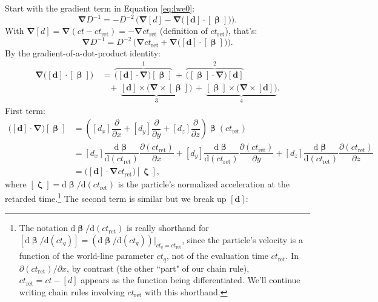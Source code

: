 \documentclass[12pt]{article}
\renewcommand{\vv}[1]{\mathbf{#1}}
\newcommand{\dd}[1]{\mathrm{d}#1}
\newcommand{\vvbeta}{\bm{\upbeta}}
\newcommand{\vvzeta}{\bm{\upzeta}}
\newcommand{\del}{\boldsymbol{\nabla}}
\begin{document}
Start with the gradient term in Equation \ref{eq:lwe0}:
\begin{equation*}
\del D^{-1} = - D^{-2} \, \Big( \del [d] - \del \big( [\vv d] \cdot [\vvbeta] \big) \Big).
\end{equation*}
With $\del [d] = \del ( ct - ct_{\mathrm{ret}} ) = - \del ct_{\mathrm{ret}}$ (definition of $ct_{\mathrm{ret}}$), that's:
\begin{equation}\label{eq:gradterm1}
\del D^{-1} = D^{-2} \, \Big( \del ct_{\mathrm{ret}} + \del \big( [\vv d] \cdot [\vvbeta] \big) \Big) .
\end{equation}
By the gradient-of-a-dot-product identity:
\begin{equation*}
\begin{aligned}
\del \big( [\vv d] \cdot [\vvbeta] \big) \, &= \, \overbrace{\big( [\vv d] \cdot \del \big) [\vvbeta]}^\text{1} \, + \, \overbrace{\big( [\vvbeta] \cdot \del \big) [\vv d]}^\text{2} \\[6pt]
& \; \; \; + \, \underbrace{[\vv d] \times \big( \del \times [\vvbeta] \big)}_\text{3} \, + \, \underbrace{[\vvbeta] \times \big( \del \times [\vv d] \big)}_\text{4} .
\end{aligned}
\end{equation*}
First term:
\begin{equation*}
\begin{aligned}
\big( [\vv d] \cdot \del \big) [\vvbeta] &= \left( [d_x] \dfrac{\partial}{\partial x} + [d_y] \dfrac{\partial}{\partial y} + [d_z] \dfrac{\partial}{\partial z} \right) \vvbeta (ct_{\mathrm{ret}}) \\[2pt]
&= [d_x] \dfrac{\dd \vvbeta}{\dd (ct_{\mathrm{ret}})} \dfrac{\partial (ct_{\mathrm{ret}})}{\partial x} + [d_y] \dfrac{\dd \vvbeta}{\dd (ct_{\mathrm{ret}})} \dfrac{\partial (ct_{\mathrm{ret}})}{\partial y} + [d_z] \dfrac{\dd \vvbeta}{\dd (ct_{\mathrm{ret}})} \dfrac{\partial (ct_{\mathrm{ret}})}{\partial z} \\[4pt]
&= \big( [\vv d] \cdot \del ct_{\mathrm{ret}} \big) [\vvzeta] ,
\end{aligned}
\end{equation*}
where $[\vvzeta] = \dd \vvbeta / \dd(ct_{\mathrm{ret}})$ is the particle's normalized acceleration at the retarded time.\footnote{The notation $\dd \vvbeta / \dd (ct_{\mathrm{ret}})$ is really shorthand for $[\dd \vvbeta / \dd (ct_q)] = (\dd \vvbeta / \dd (ct_q))\vert_{ct_q = ct_{\mathrm{ret}}}$, since the particle's velocity is a function of the world-line parameter $ct_q$, not of the evaluation time $ct_{\mathrm{ret}}$. In $\partial (ct_{\mathrm{ret}}) / \partial x$, by contrast (the other ``part" of our chain rule), $ct_{\mathrm{ret}} = ct - [d]$ appears as the function being differentiated. We'll continue writing chain rules involving $ct_{\mathrm{ret}}$ with this shorthand.} The second term is similar but we break up $[\vv d]$:
\end{document}
